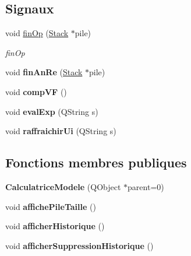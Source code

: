 \subsection*{Signaux}
\begin{DoxyCompactItemize}
\item 
void \hyperlink{class_calculatrice_modele_a17e47a75631ae25f15dfe0303ec85582}{fin\-Op} (\hyperlink{class_stack}{Stack} $\ast$pile)
\begin{DoxyCompactList}\small\item\em fin\-Op \end{DoxyCompactList}\item 
\hypertarget{class_calculatrice_modele_aa55d1cd9b194be54fa7b7730fada0cf4}{void {\bfseries fin\-An\-Re} (\hyperlink{class_stack}{Stack} $\ast$pile)}\label{class_calculatrice_modele_aa55d1cd9b194be54fa7b7730fada0cf4}

\item 
\hypertarget{class_calculatrice_modele_a8e13b38cbeccca64f4e440084a1a850e}{void {\bfseries comp\-V\-F} ()}\label{class_calculatrice_modele_a8e13b38cbeccca64f4e440084a1a850e}

\item 
\hypertarget{class_calculatrice_modele_ad741ddfdf7320455e53b0499bd9ec6b6}{void {\bfseries eval\-Exp} (Q\-String s)}\label{class_calculatrice_modele_ad741ddfdf7320455e53b0499bd9ec6b6}

\item 
\hypertarget{class_calculatrice_modele_a397e47d552424f90f8fe743f0fee70dd}{void {\bfseries raffraichir\-Ui} (Q\-String s)}\label{class_calculatrice_modele_a397e47d552424f90f8fe743f0fee70dd}

\end{DoxyCompactItemize}
\subsection*{Fonctions membres publiques}
\begin{DoxyCompactItemize}
\item 
\hypertarget{class_calculatrice_modele_acdb374ef7094036d07dfd59241674a7c}{{\bfseries Calculatrice\-Modele} (Q\-Object $\ast$parent=0)}\label{class_calculatrice_modele_acdb374ef7094036d07dfd59241674a7c}

\item 
\hypertarget{class_calculatrice_modele_ae311466b783cc6418efeaef854df461a}{void {\bfseries affiche\-Pile\-Taille} ()}\label{class_calculatrice_modele_ae311466b783cc6418efeaef854df461a}

\item 
\hypertarget{class_calculatrice_modele_aa66a666b1c62f96a3f4a2c7f0a34a7c9}{void {\bfseries afficher\-Historique} ()}\label{class_calculatrice_modele_aa66a666b1c62f96a3f4a2c7f0a34a7c9}

\item 
\hypertarget{class_calculatrice_modele_a7eb04a93cb5da9eba47fe47e97c46321}{void {\bfseries afficher\-Suppression\-Historique} ()}\label{class_calculatrice_modele_a7eb04a93cb5da9eba47fe47e97c46321}

\end{DoxyCompactItemize}

